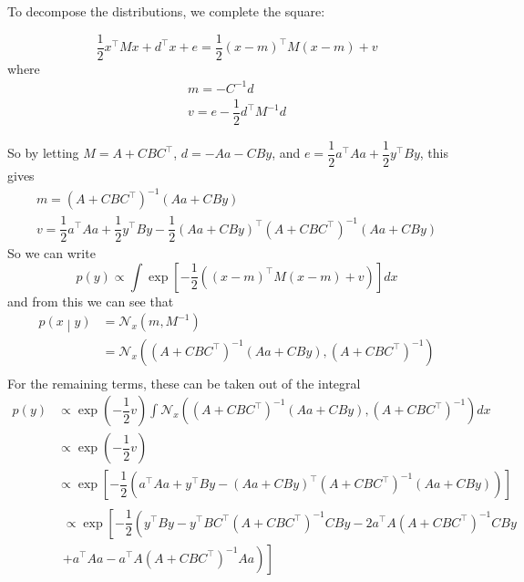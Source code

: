 \documentclass[11pt]{report} %
\begin{document}
To decompose the distributions, we complete the square:
\begin{lemma}
\begin{equation}
\dfrac{1}{2}x^{\top}Mx + d^{\top}x + e = \dfrac{1}{2}\left(x - m\right)^{\top}M\left(x - m\right) + v
\end{equation}
where
\begin{gather}
m = -C^{-1}d \\
v= e - \dfrac{1}{2}d^{\top}M^{-1}d
\end{gather}
\end{lemma}
So by letting $M = A + CBC^{\top}$, $d = -Aa - CBy$, and $e = \dfrac{1}{2}a^{\top}Aa + \dfrac{1}{2}y^{\top}By$, this gives
\begin{gather}
m = \left(A + CBC^{\top}\right)^{-1}\left(Aa + CBy\right) \\
v = \dfrac{1}{2}a^{\top}Aa + \dfrac{1}{2}y^{\top}By - \dfrac{1}{2}\left(Aa + CBy\right)^{\top}\left(A + CBC^{\top}\right)^{-1}\left(Aa + CBy\right)
\end{gather}
So we can write
\begin{equation}
p\left(y\right)\propto\int\exp\left[-\dfrac{1}{2}\left(\left(x-m\right)^{\top}M\left(x-m\right)+v\right)\right]dx
\end{equation}
and from this we can see that
\begin{align}
p\left(x\middle|y\right) &= \mathcal{N}_{x}\left(m, M^{-1}\right) \\
&= \mathcal{N}_{x}\left(\left(A + CBC^{\top}\right)^{-1}\left(Aa + CBy\right), \left(A + CBC^{\top}\right)^{-1}\right) \\
\end{align}
For the remaining terms, these can be taken out of the integral
\begin{align}
p\left(y\right) &\propto \exp\left(-\dfrac{1}{2}v \right)\int \mathcal{N}_{x}\left(\left(A + CBC^{\top}\right)^{-1}\left(Aa + CBy\right), \left(A + CBC^{\top}\right)^{-1}\right) dx \\
&\propto \exp\left(-\dfrac{1}{2}v \right) \\
&\propto \exp\left[-\dfrac{1}{2}\left(a^{\top}Aa + y^{\top}By- \left(Aa + CBy\right)^{\top}\left(A + CBC^{\top}\right)^{-1}\left(Aa + CBy\right)\right) \right] \\
&\begin{multlined} \propto \exp\left[-\dfrac{1}{2}\left(y^{\top}By-y^{\top}BC^{\top}\left(A+CBC^{\top}\right)^{-1}CBy-2a^{\top}A\left(A+CBC^{\top}\right)^{-1}CBy\right.\right. \\
\left.\left. +a^{\top}Aa-a^{\top}A\left(A+CBC^{\top}\right)^{-1}Aa\right)\right]
\end{multlined}
\end{align}
\end{document}
